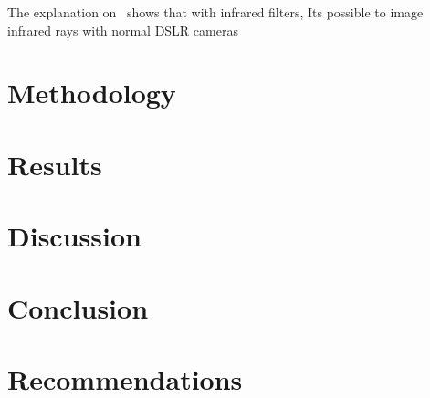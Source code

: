 \documentclass{IEEEtran}
\begin{document}
    The explanation on~\cite{irfilter} shows that with infrared filters, Its possible to image infrared rays with normal DSLR cameras



    \section{Methodology}

    \section{Results}

    \section{Discussion}

    \section{Conclusion}

    \section{Recommendations}

    
    
\end{document}
